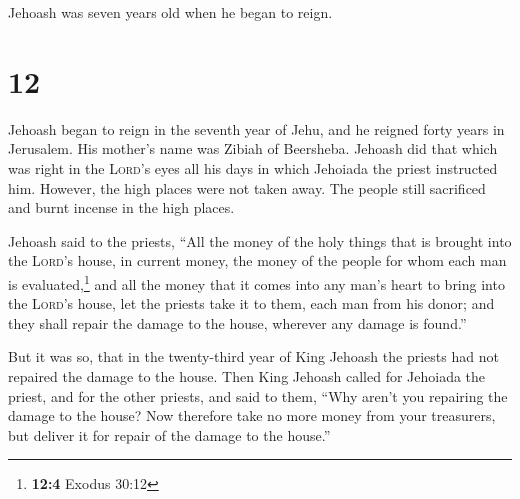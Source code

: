  Jehoash was seven years old when he began to reign.

\hypertarget{section-11}{%
\section{12}\label{section-11}}

 Jehoash began to reign in the seventh year of Jehu, and
he reigned forty years in Jerusalem. His mother's name was Zibiah of
Beersheba.  Jehoash did that which was right in the
\textsc{Lord}'s eyes all his days in which Jehoiada the priest
instructed him.  However, the high places were not taken
away. The people still sacrificed and burnt incense in the high places.

 Jehoash said to the priests, ``All the money of the holy
things that is brought into the \textsc{Lord}'s house, in current money,
the money of the people for whom each man is evaluated,\footnote{\textbf{12:4}
  Exodus 30:12} and all the money that it comes into any man's heart to
bring into the \textsc{Lord}'s house,  let the priests
take it to them, each man from his donor; and they shall repair the
damage to the house, wherever any damage is found.''

 But it was so, that in the twenty-third year of King
Jehoash the priests had not repaired the damage to the house.
 Then King Jehoash called for Jehoiada the priest, and for
the other priests, and said to them, ``Why aren't you repairing the
damage to the house? Now therefore take no more money from your
treasurers, but deliver it for repair of the damage to the house.''

